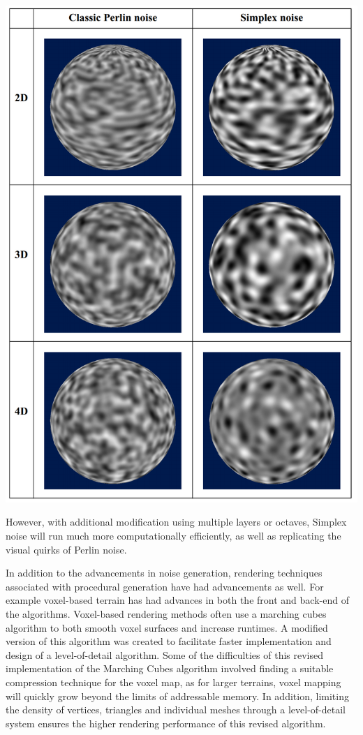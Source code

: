 \documentclass[10pt]{report}
\begin{document}
		\begin{minipage}{\textwidth}
			\centering
			\includegraphics[scale=.25]{perlin vs simplex}
			\label{fig:fig4}
		\end{minipage}
	
		However, with additional modification using multiple layers or octaves, Simplex noise will run much more computationally efficiently, as well as replicating the visual quirks of Perlin noise. 
		
		In addition to the advancements in noise generation, rendering techniques associated with procedural generation have had advancements as well. For example voxel-based terrain has had advances in both the front and back-end of the algorithms. Voxel-based rendering methods often use a marching cubes algorithm to both smooth voxel surfaces and increase runtimes. A modified version of this algorithm was created to facilitate faster implementation and design of a level-of-detail algorithm. Some of the difficulties of this revised implementation of the Marching Cubes algorithm involved finding a suitable compression technique for the voxel map, as for larger terrains, voxel mapping will quickly grow beyond the limits of addressable memory. In addition, limiting the density of vertices, triangles and individual meshes through a level-of-detail system ensures the higher rendering performance of this revised algorithm. 
		
\end{document}

